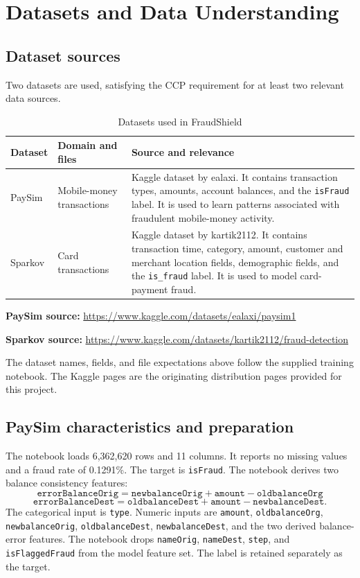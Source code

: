 \documentclass[12pt,a4paper]{report}
\begin{document}
\chapter{Datasets and Data Understanding}
\section{Dataset sources}
Two datasets are used, satisfying the CCP requirement for at least two relevant data sources.

\begin{table}[H]
\centering
\caption{Datasets used in FraudShield}
\begin{tabularx}{\textwidth}{p{2.5cm}p{3.0cm}X}
\toprule
\textbf{Dataset} & \textbf{Domain and files} & \textbf{Source and relevance}\\
\midrule
PaySim & Mobile-money transactions & Kaggle dataset by ealaxi. It contains transaction types, amounts, account balances, and the \texttt{isFraud} label. It is used to learn patterns associated with fraudulent mobile-money activity.\\
Sparkov & Card transactions & Kaggle dataset by kartik2112. It contains transaction time, category, amount, customer and merchant location fields, demographic fields, and the \texttt{is\_fraud} label. It is used to model card-payment fraud.\\
\bottomrule
\end{tabularx}
\end{table}

\textbf{PaySim source:} \url{https://www.kaggle.com/datasets/ealaxi/paysim1}

\textbf{Sparkov source:} \url{https://www.kaggle.com/datasets/kartik2112/fraud-detection}

The dataset names, fields, and file expectations above follow the supplied training notebook. The Kaggle pages are the originating distribution pages provided for this project.

\section{PaySim characteristics and preparation}
The notebook loads 6,362,620 rows and 11 columns. It reports no missing values and a fraud rate of 0.1291\%. The target is \texttt{isFraud}. The notebook derives two balance consistency features:
\[
\texttt{errorBalanceOrig} =
\texttt{newbalanceOrig}+\texttt{amount}-\texttt{oldbalanceOrg}
\]
\[
\texttt{errorBalanceDest} =
\texttt{oldbalanceDest}+\texttt{amount}-\texttt{newbalanceDest}.
\]
The categorical input is \texttt{type}. Numeric inputs are \texttt{amount}, \texttt{oldbalanceOrg}, \texttt{newbalanceOrig}, \texttt{oldbalanceDest}, \texttt{newbalanceDest}, and the two derived balance-error features. The notebook drops \texttt{nameOrig}, \texttt{nameDest}, \texttt{step}, and \texttt{isFlaggedFraud} from the model feature set. The label is retained separately as the target.
\end{document}
